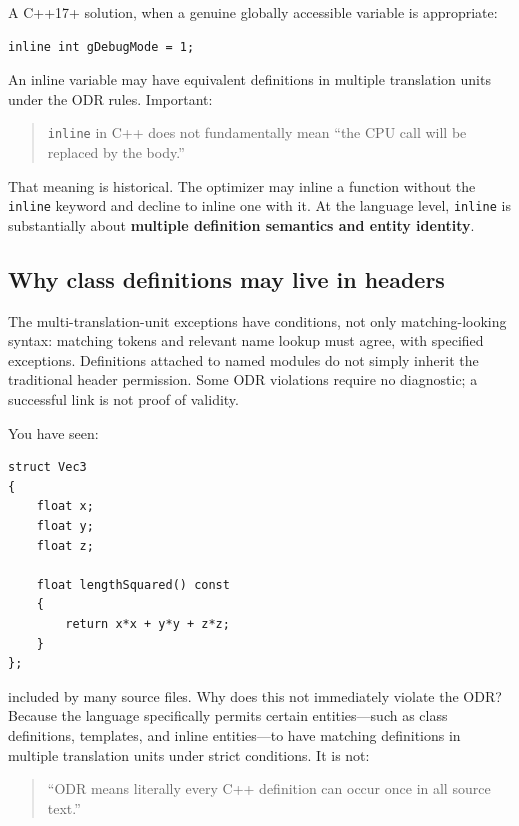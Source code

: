 A C++17+ solution, when a genuine globally accessible variable is appropriate:

\begin{verbatim}
inline int gDebugMode = 1;
\end{verbatim}

An inline variable may have equivalent definitions in multiple translation units under the ODR rules. Important:

\begin{quote}
\texttt{inline} in C++ does not fundamentally mean ``the CPU call will be replaced by the body.''
\end{quote}

That meaning is historical. The optimizer may inline a function without the \texttt{inline} keyword and decline to inline one with it. At the language level, \texttt{inline} is substantially about \textbf{multiple definition semantics and entity identity}.

\subsection{Why class definitions may live in headers}\label{05-engine-i-ch002-why-class-definitions-may-live-in-headers}

The multi-translation-unit exceptions have conditions, not only matching-looking syntax: matching tokens and relevant name lookup must agree, with specified exceptions. Definitions attached to named modules do not simply inherit the traditional header permission. Some ODR violations require no diagnostic; a successful link is not proof of validity.

You have seen:

\begin{verbatim}
struct Vec3
{
    float x;
    float y;
    float z;

    float lengthSquared() const
    {
        return x*x + y*y + z*z;
    }
};
\end{verbatim}

included by many source files. Why does this not immediately violate the ODR? Because the language specifically permits certain entities---such as class definitions, templates, and inline entities---to have matching definitions in multiple translation units under strict conditions. It is not:

\begin{quote}
``ODR means literally every C++ definition can occur once in all source text.''
\end{quote}


